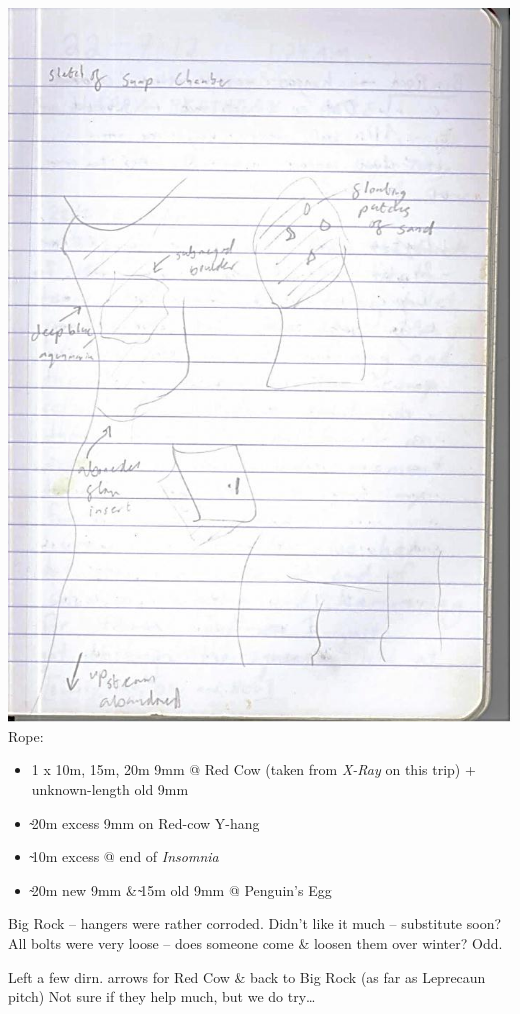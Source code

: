 \includegraphics{UgLog1012/65.jpeg}Rope:

\begin{itemize}
\tightlist
\item
  1 x 10m, 15m, 20m 9mm @ Red Cow (taken from \emph{X-Ray} on this trip)
  + unknown-length old 9mm
\item
  ̴20m excess 9mm on Red-cow Y-hang
\item
  ̴10m excess @ end of \emph{Insomnia}
\item
  ̴20m new 9mm \& ̴15m old 9mm @ Penguin's Egg
\end{itemize}

Big Rock -- hangers were rather corroded. Didn't like it much --
substitute soon? All bolts were very loose -- does someone come \&
loosen them over winter? Odd.

Left a few dirn. arrows for Red Cow \& back to Big Rock (as far as
Leprecaun pitch) Not sure if they help much, but we do try\ldots{}

